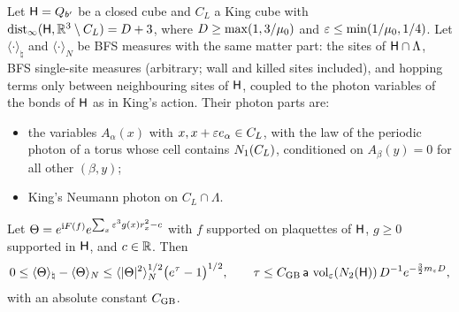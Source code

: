 \begin{lemma}\label{rot:lem:GB}
Let $\mathsf H=Q_{b'}$ be a closed cube and $C_L$ a King cube with $\operatorname{dist}_\infty(\mathsf H,\mathbb R^3\setminus C_L)=D+3$, where $D\ge\max(1,3/\mu_0)$ and $\varepsilon\le\min(1/\mu_0,1/4)$. Let $\langle\cdot\rangle_\natural$ and $\langle\cdot\rangle_N$ be BFS measures with the same matter part: the sites of $\mathsf H\cap\Lambda$, BFS single-site measures (arbitrary; wall and killed sites included), and hopping terms only between neighbouring sites of $\mathsf H$, coupled to the photon variables of the bonds of $\mathsf H$ as in King's action. Their photon parts are:
\begin{itemize}[leftmargin=*]
\item[($\natural$)] the variables $A_\alpha(x)$ with $x,x+\varepsilon e_\alpha\in C_L$, with the law of the periodic photon of a torus whose cell contains $N_{1}(C_L)$, conditioned on $A_\beta(y)=0$ for all other $(\beta,y)$;
\item[(N)] King's Neumann photon on $C_L\cap\Lambda$.
\end{itemize}
Let $\Theta=e^{\mathrm iF(f)}e^{\sum_x\varepsilon^3g(x)r_x^2-c}$ with $f$ supported on plaquettes of $\mathsf H$, $g\ge0$ supported in $\mathsf H$, and $c\in\mathbb R$. Then
\[
0\le\langle\Theta\rangle_\natural-\langle\Theta\rangle_N\le\langle|\Theta|^2\rangle_N^{1/2}\big(e^{\tau}-1\big)^{1/2},\qquad
\tau\le C_{\rm GB}\,\mathsf a\,\operatorname{vol}_{\varepsilon}(N_{2}(\mathsf H))\,D^{-1}e^{-\frac32m_{\varepsilon} D},
\]
with an absolute constant $C_{\rm GB}$.
\end{lemma}

